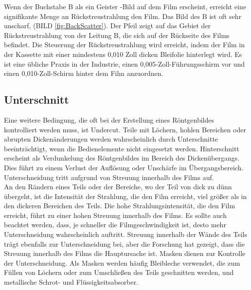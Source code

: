 Wenn der Buchstabe B als ein Geister -Bild auf dem Film erscheint, erreicht eine signifikante Menge an Rückstreustrahlung den Film. Das Bild des B ist oft sehr unscharf,
(BILD \ref{fig:BackScatter}). Der Pfeil zeigt auf das Gebiet der Rückstreustrahlung von der Leitung B, die sich auf der Rückseite des Films befindet. Die Steuerung der Rückstreustrahlung wird erreicht, indem der Film in der Kassette mit einer mindestens 0,010 Zoll dicken Bleifolie hinterlegt wird. Es ist eine übliche Praxis in der Industrie, einen 0,005-Zoll-Führungsschirm vor und einen 0,010-Zoll-Schirm hinter dem Film anzuordnen.
\subsection{Unterschnitt}
Eine weitere Bedingung, die oft bei der Erstellung eines Röntgenbildes kontrolliert werden muss, ist Undercut. Teile mit Löchern, hohlen Bereichen oder abrupten Dickenänderungen werden wahrscheinlich durch Unterschnitte beeinträchtigt, wenn die Bedienelemente nicht eingesetzt werden. Hinterschnitt erscheint als Verdunkelung des Röntgenbildes im Bereich des Dickenübergangs. Dies führt zu einem Verlust der Auflösung oder Unschärfe im Übergangsbereich. Unterschneidung tritt aufgrund von Streuung innerhalb des Films auf.\\

An den Rändern eines Teils oder der Bereiche, wo der Teil von dick zu dünn übergeht, ist die Intensität der Strahlung, die den Film erreicht, viel größer als in den dickeren Bereichen des Teils. Die hohe Strahlungsintensität, die den Film erreicht, führt zu einer hohen Streuung innerhalb des Films. Es sollte auch beachtet werden, dass, je schneller die Filmgeschwindigkeit ist, desto mehr Unterschneidung wahrscheinlich auftritt. Streuung innerhalb der Wände des Teils trägt ebenfalls zur Unterschneidung bei, aber die Forschung hat gezeigt, dass die Streuung innerhalb des Films die Hauptursache ist. Masken dienen zur Kontrolle der Unterschneidung. Als Masken werden häufig Bleibleche verwendet, die zum Füllen von Löchern oder zum Umschließen des Teils geschnitten werden, und metallische Schrot- und Flüssigkeitsabsorber.

